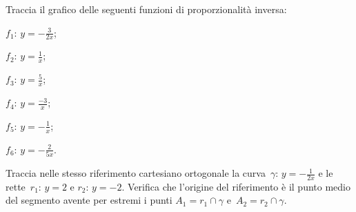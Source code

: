 
\begin{esercizio}
\label{ese:\thechapter.53}
Traccia il grafico delle seguenti funzioni di proporzionalità inversa:
\begin{multicols}{3}
 \begin{enumeratea}
\item $f_{1}:\, y=-{\frac{3}{2x}}$;
\item $f_{2}:\, y=\frac{1}{x}$;
\item $f_{3}:\, y=\frac{5}{x}$;
\item $f_{4}:\, y=\frac{-3}{x}$;
\item $f_{5}:\, y=-{\frac{1}{x}}$;
\item $f_{6}:\, y=-\frac{2}{5x}$.
\end{enumeratea}
\end{multicols}
\end{esercizio}

\begin{esercizio}
\label{ese:\thechapter.54}
Traccia nelle stesso riferimento cartesiano ortogonale la curva~$\gamma:\, y=-{\frac{1}{2x}}$ e le rette~$r_{1}:\, y=2$ e
$r_{2}:\, y=-2$. Verifica che l'origine del riferimento è il punto medio del segmento avente per estremi i punti
$A_{1}=r_{1}\cap \gamma$ e~$A_{2}=r_{2}\cap \gamma$.
\end{esercizio}

